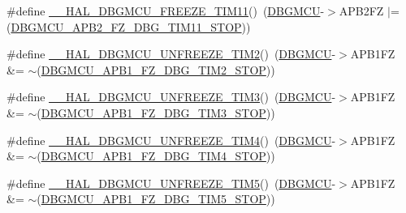 \begin{DoxyCompactItemize}
\item 
\#define \hyperlink{group___h_a_l___exported___macros_gac1f554993a6d5c7a953dab2c6cc564dd}{\+\_\+\+\_\+\+H\+A\+L\+\_\+\+D\+B\+G\+M\+C\+U\+\_\+\+F\+R\+E\+E\+Z\+E\+\_\+\+T\+I\+M11}()~(\hyperlink{group___peripheral__declaration_ga92ec6d9ec2251fda7d4ce09748cd74b4}{D\+B\+G\+M\+CU}-\/$>$A\+P\+B2\+FZ $\vert$= (\hyperlink{group___peripheral___registers___bits___definition_ga354671c942db40e69820fd783ef955b4}{D\+B\+G\+M\+C\+U\+\_\+\+A\+P\+B2\+\_\+\+F\+Z\+\_\+\+D\+B\+G\+\_\+\+T\+I\+M11\+\_\+\+S\+T\+OP}))
\item 
\#define \hyperlink{group___h_a_l___exported___macros_gafd40134436233985a840e1cd8eb6c4c3}{\+\_\+\+\_\+\+H\+A\+L\+\_\+\+D\+B\+G\+M\+C\+U\+\_\+\+U\+N\+F\+R\+E\+E\+Z\+E\+\_\+\+T\+I\+M2}()~(\hyperlink{group___peripheral__declaration_ga92ec6d9ec2251fda7d4ce09748cd74b4}{D\+B\+G\+M\+CU}-\/$>$A\+P\+B1\+FZ \&= $\sim$(\hyperlink{group___peripheral___registers___bits___definition_gaae3c5b87084934a18748f5ec168f5aef}{D\+B\+G\+M\+C\+U\+\_\+\+A\+P\+B1\+\_\+\+F\+Z\+\_\+\+D\+B\+G\+\_\+\+T\+I\+M2\+\_\+\+S\+T\+OP}))
\item 
\#define \hyperlink{group___h_a_l___exported___macros_ga5aecefa008a37ef7c6489a2e29415e69}{\+\_\+\+\_\+\+H\+A\+L\+\_\+\+D\+B\+G\+M\+C\+U\+\_\+\+U\+N\+F\+R\+E\+E\+Z\+E\+\_\+\+T\+I\+M3}()~(\hyperlink{group___peripheral__declaration_ga92ec6d9ec2251fda7d4ce09748cd74b4}{D\+B\+G\+M\+CU}-\/$>$A\+P\+B1\+FZ \&= $\sim$(\hyperlink{group___peripheral___registers___bits___definition_ga2fea6834f4ef9fc6b403cd079a001cec}{D\+B\+G\+M\+C\+U\+\_\+\+A\+P\+B1\+\_\+\+F\+Z\+\_\+\+D\+B\+G\+\_\+\+T\+I\+M3\+\_\+\+S\+T\+OP}))
\item 
\#define \hyperlink{group___h_a_l___exported___macros_gac73202fc9f0913f52ef70c42b6cab287}{\+\_\+\+\_\+\+H\+A\+L\+\_\+\+D\+B\+G\+M\+C\+U\+\_\+\+U\+N\+F\+R\+E\+E\+Z\+E\+\_\+\+T\+I\+M4}()~(\hyperlink{group___peripheral__declaration_ga92ec6d9ec2251fda7d4ce09748cd74b4}{D\+B\+G\+M\+CU}-\/$>$A\+P\+B1\+FZ \&= $\sim$(\hyperlink{group___peripheral___registers___bits___definition_ga7ac65bf9342bb8acbcb25938e93abc45}{D\+B\+G\+M\+C\+U\+\_\+\+A\+P\+B1\+\_\+\+F\+Z\+\_\+\+D\+B\+G\+\_\+\+T\+I\+M4\+\_\+\+S\+T\+OP}))
\item 
\#define \hyperlink{group___h_a_l___exported___macros_ga0669527789fb4616ec07ed711a600d04}{\+\_\+\+\_\+\+H\+A\+L\+\_\+\+D\+B\+G\+M\+C\+U\+\_\+\+U\+N\+F\+R\+E\+E\+Z\+E\+\_\+\+T\+I\+M5}()~(\hyperlink{group___peripheral__declaration_ga92ec6d9ec2251fda7d4ce09748cd74b4}{D\+B\+G\+M\+CU}-\/$>$A\+P\+B1\+FZ \&= $\sim$(\hyperlink{group___peripheral___registers___bits___definition_ga42d29d40515d36ce6ed7e5d34ed17dcf}{D\+B\+G\+M\+C\+U\+\_\+\+A\+P\+B1\+\_\+\+F\+Z\+\_\+\+D\+B\+G\+\_\+\+T\+I\+M5\+\_\+\+S\+T\+OP}))

\end{DoxyCompactItemize}
